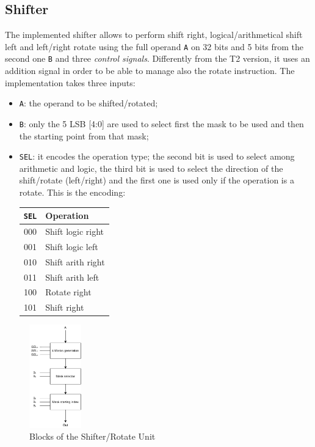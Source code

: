 \subsection{Shifter}
The implemented shifter allows to perform shift right, logical/arithmetical shift left and left/right rotate using the full operand \texttt{A} on 32 bits and 5 bits from the second one \texttt{B} and three \textit{control signals}.
Differently from the T2 version, it uses an addition signal in order to be able to manage also the rotate instruction. The implementation takes three inputs:
\begin{itemize}
    \itemsep0sp
    \item \texttt{A}: the operand to be shifted/rotated;
    \item \texttt{B}: only the 5 LSB [4:0] are used to select first the mask to be used and then the starting point from that mask;
    \item \texttt{SEL}: it encodes the operation type; the second bit is used to select among arithmetic and logic, the third bit is used to select the direction of the shift/rotate (left/right) and the first one is used only if the operation is a rotate. This is the encoding:
    \begin{center}
        \begin{tabular}{c|l}
            \texttt{SEL} & \textbf{Operation}\\
            \hline
            000 & Shift logic right \\
            001 & Shift logic left \\
            010 & Shift arith right \\
            011 & Shift arith left \\
            100 & Rotate right \\
            101 & Shift right \\
        \end{tabular}
    \end{center}
\end{itemize}

\begin{figure}[ht]
    \centering
    \includegraphics[width=0.2\textwidth]{chapters/5_ExecuteStage/images/Shifter.pdf}
    \caption{Blocks of the Shifter/Rotate Unit}
    \label{fig:shifter}
\end{figure}

